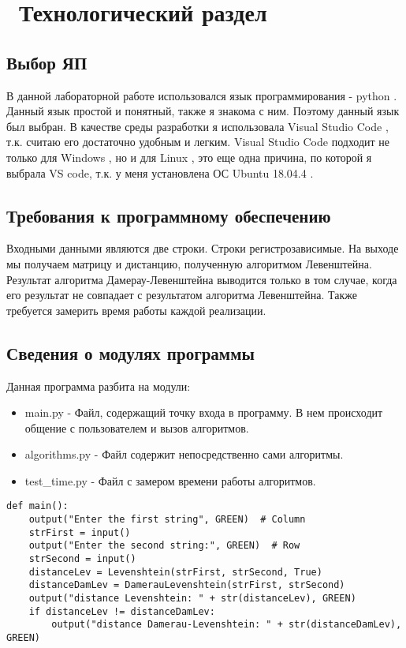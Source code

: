 \chapter{ Технологический раздел}
\label{cha:design}

\section{Выбор ЯП}

В данной лабораторной работе использовался язык программирования - python \cite{bib1}.
Данный язык простой и понятный, также я знакома с ним.
Поэтому данный язык был выбран. 
В качестве среды разработки я использовала Visual Studio Code \cite{bib2}, т.к. считаю его достаточно удобным и легким.
Visual Studio Code подходит не только для  Windows \cite{bib3}, но и для Linux \cite{bib4}, это еще одна причина, по которой я выбрала VS code, т.к. у меня установлена ОС Ubuntu 18.04.4 \cite{bib5}.

\section{Требования к программному обеспечению}

Входными данными являются две строки. Строки регистрозависимые. На выходе мы получаем матрицу и дистанцию, полученную алгоритмом Левенштейна. Результат алгоритма Дамерау-Левенштейна выводится только в том случае, когда его результат не совпадает с результатом алгоритма Левенштейна. Также требуется замерить время работы каждой реализации.

\section{Сведения о модулях программы}

Данная программа разбита на модули:

\begin{itemize}
	\item main.py - Файл, содержащий точку входа в программу. В нем происходит общение с пользователем и вызов алгоритмов.
	\item algorithms.py - Файл содержит непосредственно сами алгоритмы.
	\item test\_time.py - Файл с замером времени работы алгоритмов.
\end{itemize}


\begin{lstlisting}[label=some-code,caption=Главная функция main]
def main():
	output("Enter the first string", GREEN)  # Column
	strFirst = input()
	output("Enter the second string:", GREEN)  # Row
	strSecond = input()
	distanceLev = Levenshtein(strFirst, strSecond, True)
	distanceDamLev = DamerauLevenshtein(strFirst, strSecond)
	output("distance Levenshtein: " + str(distanceLev), GREEN)
	if distanceLev != distanceDamLev:
		output("distance Damerau-Levenshtein: " + str(distanceDamLev), GREEN)
\end{lstlisting}

